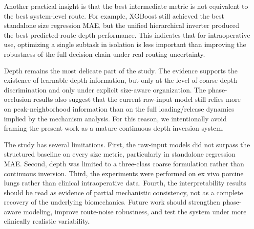 Another practical insight is that the best intermediate metric is not equivalent to the best system-level route. For example, XGBoost still achieved the best standalone size regression MAE, but the unified hierarchical inverter produced the best predicted-route depth performance. This indicates that for intraoperative use, optimizing a single subtask in isolation is less important than improving the robustness of the full decision chain under real routing uncertainty.

Depth remains the most delicate part of the study. The evidence supports the existence of learnable depth information, but only at the level of coarse depth discrimination and only under explicit size-aware organization. The phase-occlusion results also suggest that the current raw-input model still relies more on peak-neighborhood information than on the full loading/release dynamics implied by the mechanism analysis. For this reason, we intentionally avoid framing the present work as a mature continuous depth inversion system.

The study has several limitations. First, the raw-input models did not surpass the structured baseline on every size metric, particularly in standalone regression MAE. Second, depth was limited to a three-class coarse formulation rather than continuous inversion. Third, the experiments were performed on ex vivo porcine lungs rather than clinical intraoperative data. Fourth, the interpretability results should be read as evidence of partial mechanistic consistency, not as a complete recovery of the underlying biomechanics. Future work should strengthen phase-aware modeling, improve route-noise robustness, and test the system under more clinically realistic variability.
